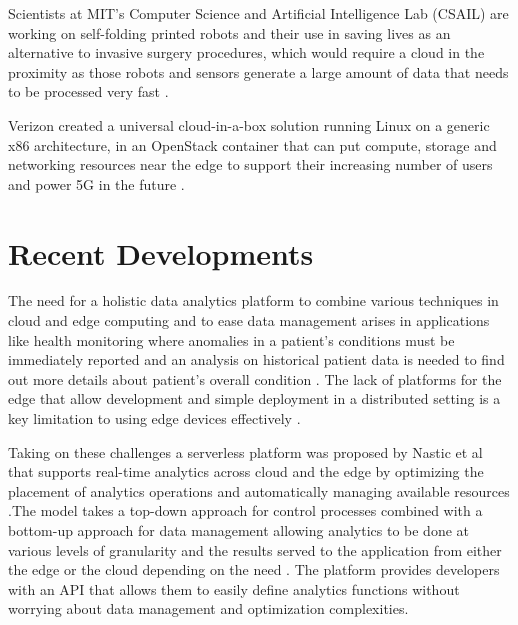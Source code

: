 \documentclass[sigconf]{acmart}
\begin{document}
Scientists at MIT's Computer Science and Artificial Intelligence Lab (CSAIL) are working on self-folding printed robots and their use in saving lives as an alternative to invasive surgery procedures, which would require a cloud in the proximity as those robots and sensors generate a large amount of data that needs to be processed very fast \cite{open-stack-living-on-edge}.

Verizon created a universal cloud-in-a-box solution running Linux on a generic x86 architecture, in an OpenStack container that can put compute, storage and networking resources near the edge to support their increasing number of users and power 5G in the future \cite{open-stack-living-on-edge}\cite{open-stack-verizon}.

\section{Recent Developments}
The need for a holistic data analytics platform to combine various techniques in cloud and edge computing and to ease data management arises in applications like health monitoring where anomalies in a patient's conditions must be immediately reported and an analysis on historical patient data is needed to find out more details about patient's overall condition \cite{ieee-serverless-platform-edge}. The lack of platforms for the edge that allow development and simple deployment in a distributed setting is a key limitation to using edge devices effectively \cite{ieee-iot-cloud-analytics-newsletter}.

Taking on these challenges a serverless platform was proposed by Nastic et al that supports real-time analytics across cloud and the edge by optimizing the placement of analytics operations and automatically managing available resources \cite{ieee-serverless-platform-edge}.The model takes a top-down approach for control processes combined with a bottom-up approach for data management allowing analytics to be done at various levels of granularity and the results served to the application from either the edge or the cloud depending on the need \cite{ieee-serverless-platform-edge}. The platform provides developers with an API that allows them to easily define analytics functions without worrying about data management and optimization complexities. 
\end{document}
